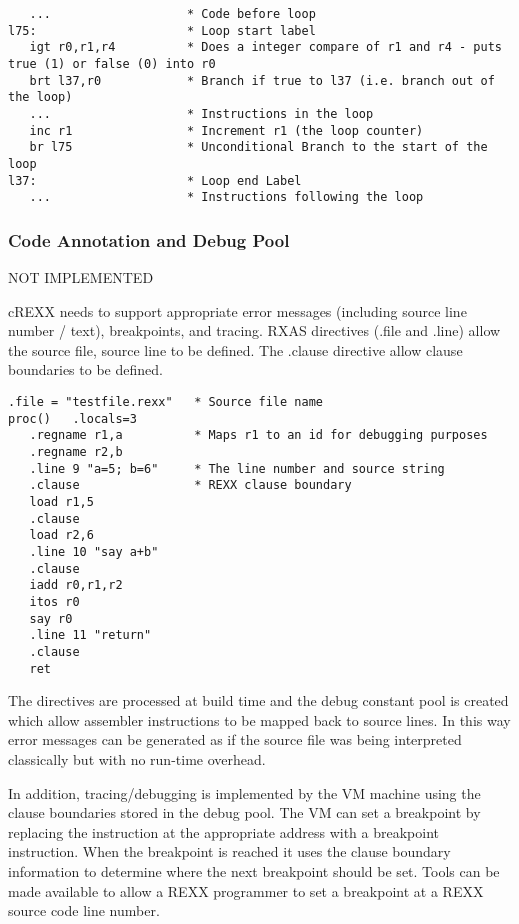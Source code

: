 \begin{verbatim}
   ...                   * Code before loop
l75:                     * Loop start label
   igt r0,r1,r4          * Does a integer compare of r1 and r4 - puts true (1) or false (0) into r0
   brt l37,r0            * Branch if true to l37 (i.e. branch out of the loop)
   ...                   * Instructions in the loop
   inc r1                * Increment r1 (the loop counter)
   br l75                * Unconditional Branch to the start of the loop
l37:                     * Loop end Label 
   ...                   * Instructions following the loop
\end{verbatim}

\subsubsection{Code Annotation and Debug Pool}

NOT IMPLEMENTED

cREXX needs to support appropriate error messages (including source line number / text), breakpoints, and tracing. RXAS directives (.file and .line) allow the source file, source line to be defined. The .clause directive allow clause boundaries to be defined.

\begin{verbatim}
.file = "testfile.rexx"   * Source file name 
proc()   .locals=3
   .regname r1,a          * Maps r1 to an id for debugging purposes 
   .regname r2,b
   .line 9 "a=5; b=6"     * The line number and source string
   .clause                * REXX clause boundary
   load r1,5
   .clause
   load r2,6
   .line 10 "say a+b"
   .clause
   iadd r0,r1,r2
   itos r0
   say r0
   .line 11 "return"
   .clause
   ret
\end{verbatim}

The directives are processed at \textquotedbl{}build time\textquotedbl{} and the debug constant pool is created which allow assembler instructions to be mapped back to source lines. In this way error messages can be generated as if the source file was being interpreted \textquotedbl{}classically\textquotedbl{} but with no run-time overhead.

In addition, tracing/debugging is implemented by the VM machine using the clause boundaries stored in the debug pool. The VM can set a breakpoint by replacing the instruction at the appropriate address with a breakpoint instruction. When the breakpoint is reached it uses the clause boundary information to determine where the next breakpoint should be set. Tools can be made available to allow a REXX programmer to set a breakpoint at a REXX source code line number.

